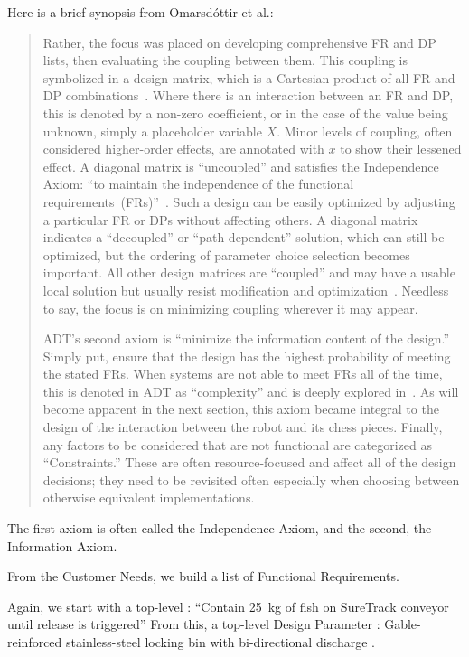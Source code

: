 \documentclass[twocolumn]{webofc}
\begin{document}
Here is a brief synopsis from Omarsdóttir et al.\cite{omarsdottir2016chessmate}:
\begin{quotation}
  Rather, the focus was placed on developing comprehensive FR and DP lists, then evaluating the coupling between them.
  This coupling is symbolized in a design matrix, which is a Cartesian product of all FR and DP combinations~\cite{cochran2016msdd, benevides2012aed}.
Where there is an interaction between an FR and DP, this is denoted by a non-zero coefficient, or in the case of the value being unknown, simply a placeholder variable $X$.
Minor levels of coupling, often considered higher-order effects, are annotated with $x$ to show their lessened effect.
A diagonal matrix is ``uncoupled'' and satisfies the Independence Axiom: ``to maintain the independence of the functional requirements~(FRs)''~\cite{suh2001axiomatic}.
Such a design can be easily optimized by adjusting a particular FR or DPs without affecting others.
A diagonal matrix indicates a ``decoupled'' or ``path-dependent'' solution, which can still be optimized, but the ordering of parameter choice selection becomes important.
All other design matrices are ``coupled'' and may have a usable local solution but usually resist modification and optimization~\cite{suh2001axiomatic}.
Needless to say, the focus is on minimizing coupling wherever it may appear.

ADT's second axiom is ``minimize the information content of the design.''
Simply put, ensure that the design has the highest probability of meeting the stated FRs.
When systems are not able to meet FRs all of the time, this is denoted in ADT as ``complexity'' and is deeply explored in~\cite{suh2005complexity}.
As will become apparent in the next section, this axiom became integral to the design of the interaction between the robot and its chess pieces.
Finally, any factors to be considered that are not functional are categorized as ``Constraints.''
These are often resource-focused and affect all of the design decisions; they need to be revisited often especially when choosing between otherwise equivalent implementations.
\end{quotation}
The first axiom is often called the Independence Axiom, and the second, the Information Axiom.


From the Customer Needs, we build a list of Functional Requirements.

Again, we start with a top-level : ``Contain \SI{25}{\kilogram} of fish on SureTrack conveyor until release is triggered''
From this, a top-level Design Parameter : Gable-reinforced stainless-steel locking bin with bi-directional discharge
\cite{gerhard2016suretrack}.
\end{document}
